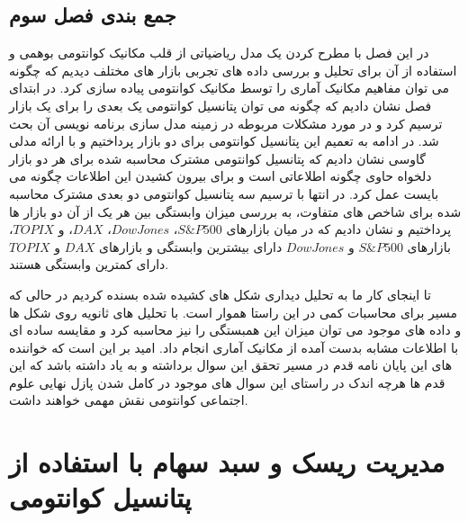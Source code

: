 \documentclass[a4paper,titlepage,12pt,fleqn,oneside]{report}
\begin{document}
\section{جمع بندی فصل سوم}
در این فصل با مطرح کردن یک مدل ریاضیاتی از قلب مکانیک کوانتومی بوهمی و استفاده از آن برای تحلیل و بررسی داده های تجربی بازار های مختلف دیدیم که چگونه می توان مفاهیم مکانیک آماری را توسط مکانیک کوانتومی پیاده سازی کرد. در ابتدای فصل نشان دادیم که چگونه می توان پتانسیل کوانتومی یک بعدی را برای یک بازار ترسیم کرد و در مورد مشکلات مربوطه در زمینه مدل سازی برنامه نویسی آن بحث شد. در ادامه به تعمیم این پتانسیل کوانتومی برای دو بازار پرداختیم و با ارائه مدلی گاوسی نشان دادیم که پتانسیل کوانتومی مشترک محاسبه شده برای هر دو بازار دلخواه حاوی چگونه اطلاعاتی است و برای بیرون کشیدن این اطلاعات چگونه می بایست عمل کرد. در انتها با ترسیم سه پتانسیل کوانتومی دو بعدی مشترک محاسبه شده برای شاخص های متفاوت، به بررسی میزان وابستگی بین هر یک از آن دو بازار ها پرداختیم و نشان دادیم که در میان بازارهای 
$S\&P500$،
$Dow Jones$،
$DAX$،
و
$TOPIX$،
 بازارهای 
 $S\&P500$
 و 
 $Dow Jones$
 دارای بیشترین وابستگی  و بازارهای 
 $DAX$
 و
 $TOPIX$
 دارای کمترین وابستگی هستند. 
 
 
 تا اینجای کار ما به تحلیل دیداری شکل های کشیده شده بسنده کردیم در حالی که مسیر برای محاسبات کمی در این راستا هموار است. با تحلیل های ثانویه روی شکل ها و داده های موجود می توان میزان این همبستگی را نیز محاسبه کرد و مقایسه ساده ای با اطلاعات مشابه بدست آمده از مکانیک آماری انجام داد. امید بر این است که خواننده های این پایان نامه قدم در مسیر تحقق این سوال برداشته و به یاد داشته باشد که این قدم ها هرچه اندک در راستای این سوال های موجود در کامل شدن پازل نهایی علوم اجتماعی کوانتومی نقش مهمی خواهند داشت.
 
\newpage
\chapter{مدیریت ریسک و  سبد سهام با استفاده از پتانسیل کوانتومی}
\end{document}
